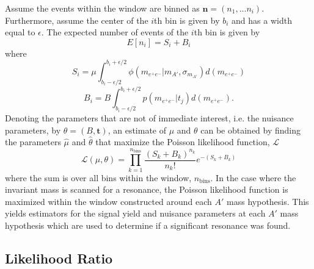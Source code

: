 Assume the events within the window are binned as $\mathbf{n} = (n_{1}, ... n_{i})$.
Furthermore, assume the center of the $i$th bin is given by $b_i$ and has a width
equal to $\epsilon$. 
The expected number of events of the $i$th bin is given by 
\begin{equation}
    E[n_i] = S_{i} + B_{i}
\end{equation}
where 
\begin{equation}
    S_{i} = \mu \int_{b_i - \epsilon/2}^{b_i + \epsilon/2} \phi(m_{e^+e^-} | m_{A'}, \sigma_{m_{A'}}) d (m_{e^+e^-})
\end{equation} 
\begin{equation}
    B_{i} = B \int_{b_i - \epsilon/2}^{b_i + \epsilon/2} p(m_{e^+e^-} | t_{j}) d (m_{e^+e^-}).
\end{equation}
Denoting the parameters that are not of immediate interest, i.e. the nuisance
parameters, by $\theta = (B,  \mathbf{t})$, an estimate
of $\mu$ and $\theta$ can be obtained by finding the parameters $\hat{\mu}$ and
$\hat{\theta}$ that maximize the Poisson likelihood function, $\mathcal{L}$
\begin{equation}
\mathcal{L}(\mu, \theta) = \prod_{k=1}^{n_{\text{bins}}} \frac{(S_{k} + B_{k})^{n_k}}{n_{k}!} e^{-(S_{k} + B_{k})}
\end{equation}
where the sum is over all bins within the window, $n_{\text{bins}}$.
In the case where the invariant mass is scanned for a resonance, the Poisson 
likelihood function is maximized within the window constructed around each
$A'$ mass hypothesis. This yields estimators for the signal yield and nuisance
parameters at each $A'$ mass hypothesis which are used to determine if a significant 
resonance was found.

\subsection{Likelihood Ratio} \label{sub:likelihood_ratio}

